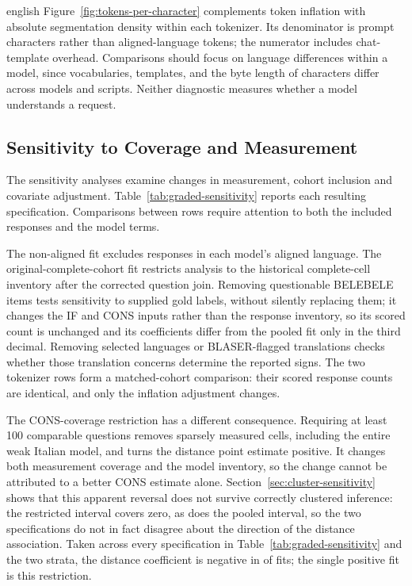 \begin{otherlanguage*}{english}
Figure~\ref{fig:tokens-per-character} complements token inflation with absolute segmentation density within each tokenizer. Its denominator is prompt characters rather than aligned-language tokens; the numerator includes chat-template overhead. Comparisons should focus on language differences within a model, since vocabularies, templates, and the byte length of characters differ across models and scripts. Neither diagnostic measures whether a model understands a request.

\subsection{Sensitivity to Coverage and Measurement}

The sensitivity analyses examine changes in measurement, cohort inclusion and covariate adjustment. Table~\ref{tab:graded-sensitivity} reports each resulting specification. Comparisons between rows require attention to both the included responses and the model terms.

\clearpage
\GradedSensitivityTable

The non-aligned fit excludes responses in each model's aligned language. The original-complete-cohort fit restricts analysis to the historical complete-cell inventory after the corrected question join. Removing questionable BELEBELE items tests sensitivity to supplied gold labels, without silently replacing them; it changes the IF and CONS inputs rather than the response inventory, so its scored count is unchanged and its coefficients differ from the pooled fit only in the third decimal. Removing selected languages or BLASER-flagged translations checks whether those translation concerns determine the reported signs. The two tokenizer rows form a matched-cohort comparison: their scored response counts are identical, and only the inflation adjustment changes.

The CONS-coverage restriction has a different consequence. Requiring at least 100 comparable questions removes sparsely measured cells, including the entire weak Italian model, and turns the distance point estimate positive. It changes both measurement coverage and the model inventory, so the change cannot be attributed to a better CONS estimate alone. Section~\ref{sec:cluster-sensitivity} shows that this apparent reversal does not survive correctly clustered inference: the restricted interval covers zero, as does the pooled interval, so the two specifications do not in fact disagree about the direction of the distance association. Taken across every specification in Table~\ref{tab:graded-sensitivity} and the two strata, the distance coefficient is negative in \RDistanceNegativeCount{} of \RDistanceSpecCount{} fits; the single positive fit is this restriction.


\end{otherlanguage*}

